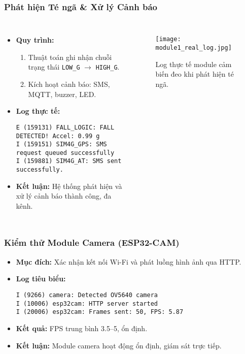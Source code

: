 \begin{frame}[t,fragile]
\frametitle{Phát hiện Té ngã \& Xử lý Cảnh báo}
\begin{columns}[T]
    \begin{itemize}
        \item \textbf{Quy trình:}
        \begin{enumerate}
            \item Thuật toán ghi nhận chuỗi trạng thái \texttt{LOW\_G} $\to$ \texttt{HIGH\_G}.
            \item Kích hoạt cảnh báo: SMS, MQTT, buzzer, LED.
        \end{enumerate}
        \item \textbf{Log thực tế:}
        \begin{verbatim}
E (159131) FALL_LOGIC: FALL DETECTED! Accel: 0.99 g
I (159151) SIM4G_GPS: SMS request queued successfully
I (159881) SIM4G_AT: SMS sent successfully.
        \end{verbatim}
        \item \textbf{Kết luận:} Hệ thống phát hiện và xử lý cảnh báo thành công, đa kênh.
    \end{itemize}
    \begin{figure}
        \centering
        \texttt{[image: module1\_real\_log.jpg]}
        \caption{Log thực tế module cảm biến đeo khi phát hiện té ngã.}
    \end{figure}
\end{columns}
\end{frame}

\begin{frame}[t,fragile]
\frametitle{Kiểm thử Module Camera (ESP32-CAM)}
\begin{itemize}
    \item \textbf{Mục đích:} Xác nhận kết nối Wi-Fi và phát luồng hình ảnh qua HTTP.
    \item \textbf{Log tiêu biểu:}
    \begin{verbatim}
I (9266) camera: Detected OV5640 camera
I (10006) esp32cam: HTTP server started
I (20006) esp32cam: Frames sent: 50, FPS: 5.87
    \end{verbatim}
    \item \textbf{Kết quả:} FPS trung bình 3.5–5, ổn định.
    \item \textbf{Kết luận:} Module camera hoạt động ổn định, giám sát trực tiếp.
\end{itemize}
\end{frame}

